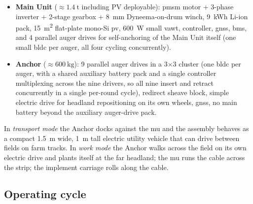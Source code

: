 \documentclass[11pt,a4paper]{article}
\begin{document}
\begin{itemize}[leftmargin=1.6em,itemsep=0.15em]
    \item \textbf{Main Unit} (${\approx}\SI{1.4}{\tonne}$ including PV deployable): \gls{pmsm} motor + 3-phase inverter + 2-stage gearbox + \SI{8}{\milli\meter} Dyneema-on-drum winch, \SI{9}{\kWh} Li-ion pack, \SI{15}{\meter\squared} flat-plate mono-Si \gls{pv}, \SI{600}{\watt} small \gls{vawt}, controller, \gls{gnss}, \gls{bms}, and 4 parallel auger drives for self-anchoring of the Main Unit itself (one small \gls{bldc} per auger, all four cycling concurrently).
    \item \textbf{Anchor} (${\approx}\SI{600}{\kilogram}$): 9 parallel auger drives in a 3$\times$3 cluster (one \gls{bldc} per auger, with a shared auxiliary battery pack and a single controller multiplexing across the nine drivers, so all nine insert and retract concurrently in a single per-round cycle), redirect sheave block, simple electric drive for headland repositioning on its own wheels, \gls{gnss}, no main battery beyond the auxiliary auger-drive pack.
\end{itemize}

In \emph{transport mode} the Anchor docks against the \gls{mu} and the assembly behaves as a compact \SI{1.5}{\meter} wide, \SI{1}{\meter} tall electric utility vehicle that can drive between fields on farm tracks. In \emph{work mode} the Anchor walks across the field on its own electric drive and plants itself at the far headland; the \gls{mu} runs the cable across the strip; the implement carriage rolls along the cable.

\subsection{Operating cycle}\label{sec:cycle}
\end{document}
